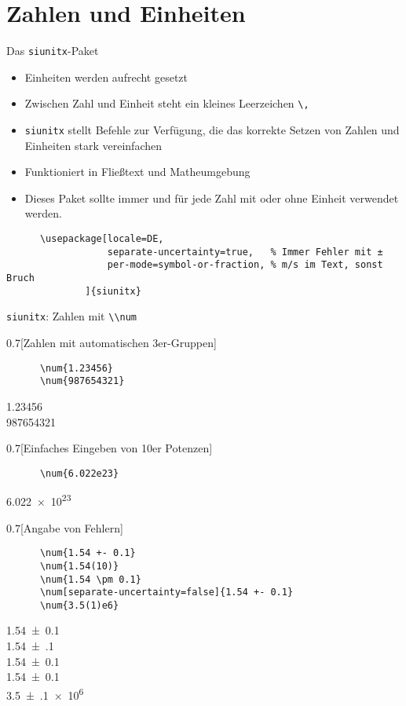 \section{Zahlen und Einheiten}

\begin{frame}[fragile]{
  Das \texttt{siunitx}-Paket
  \hfill{}
}
\begin{itemize}
    \item Einheiten werden aufrecht gesetzt
    \item Zwischen Zahl und Einheit steht ein kleines Leerzeichen \verb+\,+
    \item \texttt{siunitx} stellt Befehle zur Verfügung, die das korrekte Setzen von Zahlen und Einheiten stark vereinfachen
    \item Funktioniert in Fließtext und Matheumgebung
    \item[$\color{vertexDarkRed}\Rightarrow$] Dieses Paket sollte \alert{immer} und für \alert{jede} Zahl mit oder ohne Einheit verwendet werden.
\end{itemize}
  \begin{Packages}
    \begin{lstlisting}
      \usepackage[locale=DE,
                  separate-uncertainty=true,   % Immer Fehler mit ±
                  per-mode=symbol-or-fraction, % m/s im Text, sonst Bruch
              ]{siunitx}
    \end{lstlisting}
  \end{Packages}
\end{frame}
\begin{frame}[fragile]{\texttt{siunitx}: Zahlen mit \lstinline+\\num+}
  \begin{CodeExample}{0.7}[Zahlen mit automatischen 3er-Gruppen]
    \begin{lstlisting}
      \num{1.23456}
      \num{987654321}
    \end{lstlisting}
  \CodeResult
    \num{1.23456}\\
    \num{987654321}
  \end{CodeExample}
  \begin{CodeExample}{0.7}[Einfaches Eingeben von 10er Potenzen]
    \begin{lstlisting}
      \num{6.022e23}
    \end{lstlisting}
  \CodeResult
  \num{6.022e23}
  \end{CodeExample}
  \begin{CodeExample}{0.7}[Angabe von Fehlern]
    \begin{lstlisting}
      \num{1.54 +- 0.1}
      \num{1.54(10)}
      \num{1.54 \pm 0.1}
      \num[separate-uncertainty=false]{1.54 +- 0.1}
      \num{3.5(1)e6}
    \end{lstlisting}
  \CodeResult
    \num{1.54 +- 0.1}\\
    \num{1.54(10)} \\
    \num{1.54 \pm 0.1} \\
    \num[separate-uncertainty=false]{1.54 +- 0.1}\\
    \num{3.5(1)e6}
  \end{CodeExample}
\end{frame}
